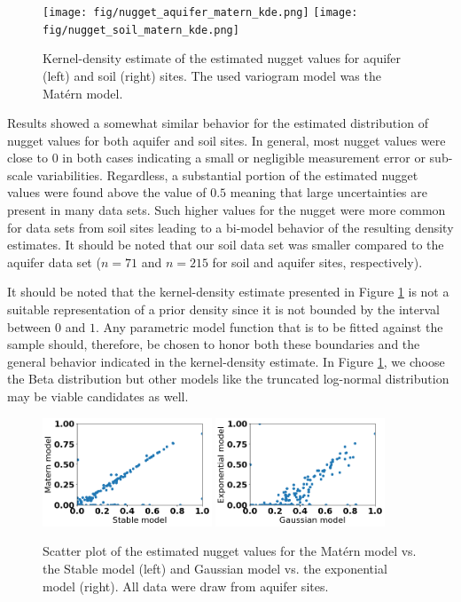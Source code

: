 \documentclass{article}
\begin{document}
\begin{figure}[ht]
    \texttt{[image: fig/nugget\_aquifer\_matern\_kde.png]}
    \texttt{[image: fig/nugget\_soil\_matern\_kde.png]}
    \caption{Kernel-density estimate of the estimated nugget values for aquifer (left) and soil (right) sites. The used variogram model was the Mat{\'e}rn model.}
    \label{fig:nugget_matern}
\end{figure}

Results showed a somewhat similar behavior for the estimated distribution of nugget values for both aquifer and soil sites.  In general, most nugget values were close to $0$ in both cases indicating a small or negligible measurement error or sub-scale variabilities. Regardless, a substantial portion of the estimated nugget values were found above the value of $0.5$ meaning that large uncertainties are present in many data sets. Such higher values for the nugget were more common for data sets from soil sites leading to a bi-model behavior of the resulting density estimates. It should be noted that our soil data set was smaller compared to the aquifer data set ($n=71$ and $n=215$ for soil and aquifer sites, respectively). 

It should be noted that the kernel-density estimate presented in Figure \ref{fig:nugget_matern} is not a suitable representation of a prior density since it is not bounded by the interval between $0$ and $1$. Any parametric model function that is to be fitted against the sample should, therefore, be chosen to honor both these boundaries and the general behavior indicated in the kernel-density estimate. In Figure \ref{fig:nugget_matern}, we choose the Beta distribution but other models like the truncated log-normal distribution may be viable candidates as well.

\begin{figure}[ht]
    \includegraphics[width=0.45\textwidth]{fig/nugget_scatter_matern_stable.png}
    \includegraphics[width=0.45\textwidth]{fig/nugget_scatter_gaussian_exponential.png}
    \caption{Scatter plot of the estimated nugget values for the Mat{\'e}rn model vs. the Stable model (left) and Gaussian model vs. the exponential model (right). All data were draw from aquifer sites.}
    \label{fig:nugget_scatter}
\end{figure}
\end{document}
